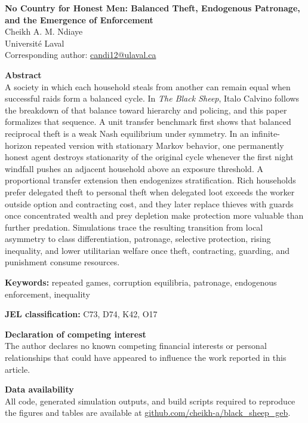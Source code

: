 \documentclass[12pt]{article}
\begin{document}
\thispagestyle{empty}

\begin{center}
{\Large \textbf{No Country for Honest Men: Balanced Theft, Endogenous Patronage, and the Emergence of Enforcement}}\\[1.5em]
Cheikh A. M. Ndiaye\\[0.5em]
Université Laval\\[0.25em]
Corresponding author: \href{mailto:candi12@ulaval.ca}{candi12@ulaval.ca}\\[1.5em]
\end{center}

\noindent \textbf{Abstract}\\
A society in which each household steals from another can remain equal when successful raids form a balanced cycle. In \emph{The Black Sheep}, Italo Calvino follows the breakdown of that balance toward hierarchy and policing, and this paper formalizes that sequence. A unit transfer benchmark first shows that balanced reciprocal theft is a weak Nash equilibrium under symmetry. In an infinite-horizon repeated version with stationary Markov behavior, one permanently honest agent destroys stationarity of the original cycle whenever the first night windfall pushes an adjacent household above an exposure threshold. A proportional transfer extension then endogenizes stratification. Rich households prefer delegated theft to personal theft when delegated loot exceeds the worker outside option and contracting cost, and they later replace thieves with guards once concentrated wealth and prey depletion make protection more valuable than further predation. Simulations trace the resulting transition from local asymmetry to class differentiation, patronage, selective protection, rising inequality, and lower utilitarian welfare once theft, contracting, guarding, and punishment consume resources.

\vspace{1em}
\noindent \textbf{Keywords:} repeated games, corruption equilibria, patronage, endogenous enforcement, inequality

\par\noindent \textbf{JEL classification:} C73, D74, K42, O17

\vspace{1em}
\noindent \textbf{Declaration of competing interest}\\
The author declares no known competing financial interests or personal relationships that could have appeared to influence the work reported in this article.

\vspace{1em}
\noindent \textbf{Data availability}\\
All code, generated simulation outputs, and build scripts required to reproduce the figures and tables are available at \href{https://github.com/cheikh-a/black_sheep_geb}{github.com/cheikh-a/black\_sheep\_geb}.
\end{document}
